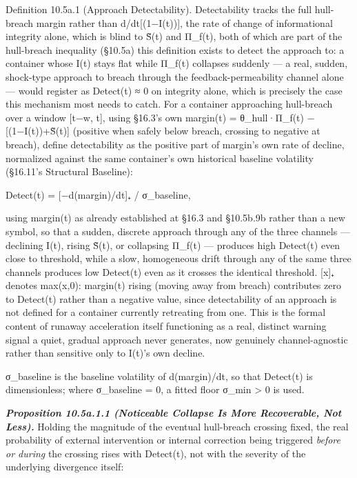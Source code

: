 \documentclass[
]{article}
\begin{document}
Definition 10.5a.1 (Approach Detectability). Detectability tracks the
full hull-breach margin rather than d/dt{[}(1−I(t)){]}, the rate of
change of informational integrity alone, which is blind to S̃(t) and
Π\_f(t), both of which are part of the hull-breach inequality (§10.5a)
this definition exists to detect the approach to: a container whose I(t)
stays flat while Π\_f(t) collapses suddenly --- a real, sudden,
shock-type approach to breach through the feedback-permeability channel
alone --- would register as Detect(t) ≈ 0 on integrity alone, which is
precisely the case this mechanism most needs to catch. For a container
approaching hull-breach over a window {[}t−w, t{]}, using §16.3's own
margin(t) = θ\_hull·Π\_f(t) − {[}(1−I(t))+S̃(t){]} (positive when safely
below breach, crossing to negative at breach), define detectability as
the positive part of margin's own rate of decline, normalized against
the same container's own historical baseline volatility (§16.11's
Structural Baseline):

Detect(t) = {[}−d(margin)/dt{]}₊ / σ\_baseline,

using margin(t) as already established at §16.3 and §10.5b.9b rather
than a new symbol, so that a sudden, discrete approach through any of
the three channels --- declining I(t), rising S̃(t), or collapsing
Π\_f(t) --- produces high Detect(t) even close to threshold, while a
slow, homogeneous drift through any of the same three channels produces
low Detect(t) even as it crosses the identical threshold. {[}x{]}₊
denotes max(x,0): margin(t) rising (moving away from breach) contributes
zero to Detect(t) rather than a negative value, since detectability of
an approach is not defined for a container currently retreating from
one. This is the formal content of runaway acceleration itself
functioning as a real, distinct warning signal a quiet, gradual approach
never generates, now genuinely channel-agnostic rather than sensitive
only to I(t)'s own decline.

σ\_baseline is the baseline volatility of d(margin)/dt, so that
Detect(t) is dimensionless; where σ\_baseline = 0, a fitted floor σ\_min
\textgreater{} 0 is used.

\emph{\textbf{Proposition 10.5a.1.1 (Noticeable Collapse Is More
Recoverable, Not Less).}} Holding the magnitude of the eventual
hull-breach crossing fixed, the real probability of external
intervention or internal correction being triggered \emph{before or
during} the crossing rises with Detect(t), not with the severity of the
underlying divergence itself:
\end{document}
